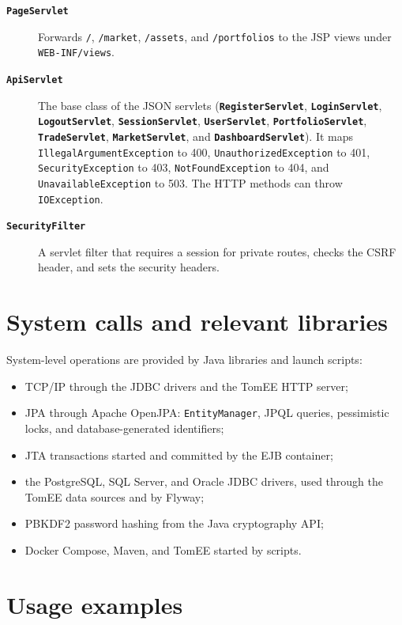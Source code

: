 \documentclass[12pt,a4paper]{article}
\newcommand{\code}[1]{\texttt{\small #1}}
\newcommand{\class}[1]{\textbf{\code{#1}}}
\begin{document}
\begin{description}
\item[\class{PageServlet}] Forwards \code{/}, \code{/market},
\code{/assets}, and \code{/portfolios} to the JSP views under
\code{WEB-INF/views}.

\item[\class{ApiServlet}] The base class of the JSON servlets
(\class{RegisterServlet}, \class{LoginServlet}, \class{LogoutServlet},
\class{SessionServlet}, \class{UserServlet}, \class{PortfolioServlet},
\class{TradeServlet}, \class{MarketServlet}, and \class{DashboardServlet}).
It maps \code{IllegalArgumentException} to 400,
\code{UnauthorizedException} to 401, \code{SecurityException} to 403,
\code{NotFoundException} to 404, and \code{UnavailableException} to 503.
The HTTP methods can throw \code{IOException}.

\item[\class{SecurityFilter}] A servlet filter that requires a session for
private routes, checks the CSRF header, and sets the security headers.
\end{description}

\section{System calls and relevant libraries}

System-level operations are provided by Java libraries and launch scripts:

\begin{itemize}
    \item TCP/IP through the JDBC drivers and the TomEE HTTP server;
    \item JPA through Apache OpenJPA: \code{EntityManager}, JPQL queries,
    pessimistic locks, and database-generated identifiers;
    \item JTA transactions started and committed by the EJB container;
    \item the PostgreSQL, SQL Server, and Oracle JDBC drivers, used through
    the TomEE data sources and by Flyway;
    \item PBKDF2 password hashing from the Java cryptography API;
    \item Docker Compose, Maven, and TomEE started by scripts.
\end{itemize}

\section{Usage examples}
\end{document}
